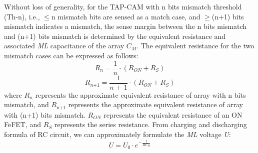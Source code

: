 Without loss of generality, 
for the TAP-CAM with n bits mismatch threshold (Th-n), i.e., $\leq$n mismatch bits are sensed as a match case, and $\ge$(n+1) bits mismatch indicates a mismatch, the sense margin between the n bits mismatch and (n+1) bits mismatch is determined by the equivalent resistance and associated \textit{ML} capacitance of the array $\textit{C}_\textit{M}$.
The equivalent resistance for the two mismatch cases can be expressed as follows:
\begin{equation}
\label{eq:R-C circuit1}
      \textit{R}_\textit{n} = \frac{\text{1}}{\textit{n}}\cdot (\textit{R}_\textit{ON}+\textit{R}_\textit{S})
\end{equation}
\begin{equation}
\label{eq:R-C circuit2}
     \textit{R}_{\textit{n}\text{+1}} = \frac{\text{1}}{\textit{n}\text{ + 1}}\cdot (\textit{R}_\textit{ON}+\textit{R}_\textit{S})
\end{equation}
where $\textit{R}_\textit{n}$ represents the approximate equivalent resistance of array with n bits mismatch, and $\textit{R}_\text{n+1}$ represents the approximate equivalent resistance of array with (n+1) bits mismatch. %
$\textit{R}_\textit{ON}$ represents the equivalent resistance of an ON FeFET, and $\textit{R}_\textit{S}$ represents the series resistance. 
From charging and discharging formula of RC circuit, we can approximately formulate the \textit{ML} voltage \textit{U}:
\begin{equation}
\label{eq:R-C circuit3}
      \textit{U}=\textit{U}_\text{0}\cdot \textit{e}^{-\frac{\textit{t}}{\textit{RC}_\textit{M}}}
\end{equation}

